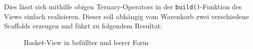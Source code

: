 Dies lässt sich mithilfe obigen Ternary-Operators in der \lstinline{build()}-Funktion des Views
einfach realisieren. Dieser soll abhängig vom Warenkorb zwei verschiedene Scaffolds erzeugen und
führt zu folgendem Resultat:

\begin{figure}[H]
    \centering
    \hfill
    \hfill
    \hfill
    \caption{Basket-View in befüllter und leerer Form}
\end{figure}